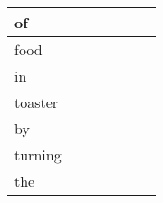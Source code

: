 \documentclass[landscape]{article}
\newcommand{\ssp}{\hspace{2pt}}
\begin{document}
\begin{tabular}{|l|p{10pt}|p{10pt}|p{10pt}|p{10pt}|p{10pt}|p{10pt}|}
\hline
\ssp of \ssp&\hspace{2pt}&\hspace{2pt}&\hspace{2pt}&\hspace{2pt}&\hspace{2pt}&\hspace{2pt}\\
\hline
\ssp food \ssp&\hspace{2pt}&\hspace{2pt}&\hspace{2pt}&\hspace{2pt}&\hspace{2pt}&\hspace{2pt}\\
\hline
\ssp in \ssp&\hspace{2pt}&\hspace{2pt}&\hspace{2pt}&\hspace{2pt}&\hspace{2pt}&\hspace{2pt}\\
\hline
\ssp toaster \ssp&\hspace{2pt}&\hspace{2pt}&\hspace{2pt}&\hspace{2pt}&\hspace{2pt}&\hspace{2pt}\\
\hline
\ssp by \ssp&\hspace{2pt}&\hspace{2pt}&\hspace{2pt}&\hspace{2pt}&\hspace{2pt}&\hspace{2pt}\\
\hline
\ssp turning \ssp&\hspace{2pt}&\hspace{2pt}&\hspace{2pt}&\hspace{2pt}&\hspace{2pt}&\hspace{2pt}\\
\hline
\ssp the \ssp&\hspace{2pt}&\hspace{2pt}&\hspace{2pt}&\hspace{2pt}&\hspace{2pt}&\hspace{2pt}\\

\end{tabular}
\end{document}
